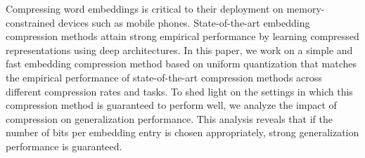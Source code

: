 

Compressing word embeddings is critical to their deployment on memory-constrained devices such as mobile phones.
State-of-the-art embedding compression methods attain strong empirical performance by learning compressed representations using deep architectures.
In this paper, we work on a simple and fast embedding compression method based on uniform quantization that matches the empirical performance of state-of-the-art compression methods across different compression rates and tasks.
To shed light on the settings in which this compression method is guaranteed to perform well, we analyze the impact of compression on generalization performance.
This analysis reveals that if the number of bits per embedding entry is chosen appropriately, strong generalization performance is guaranteed.

%
%
%
%
%

